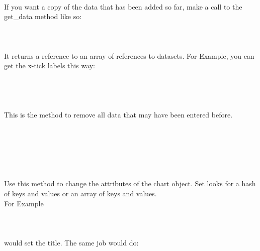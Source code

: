 \\
\\
 \\
If you want a copy of the data that has been added so far, make a call to the get\_data method like so:\\
\\
\\
\\
It returns a reference to an array of references to datasets. For Example, you can get the x-tick labels this way:\\
\\
\\
\\ 
 \\
This is the method to remove all data that may have been entered before.\\
\\
\\
\\
\\
\\
\\
Use this method to change the attributes of the chart object. Set looks for a hash of keys and values or an array of keys and values.\\
For Example\\
\\
\\
\\
would set the title. The same job would do:\\
\\
\\ 
\\
\\
\\
 \\
 \\
 \\
\\
